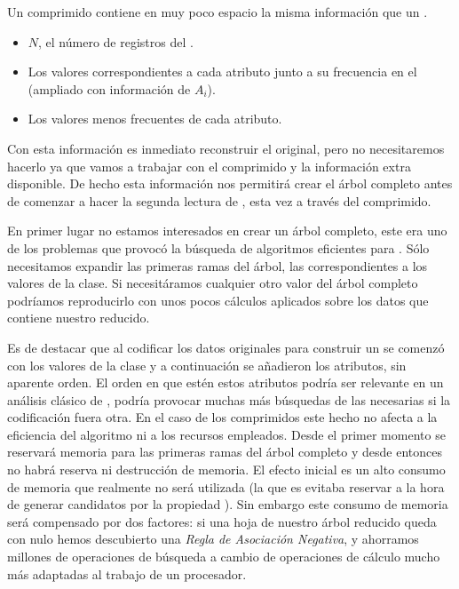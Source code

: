\ABIERTO

Un \catalogo comprimido contiene en muy poco espacio la misma información que un \catalogo.
\begin{itemize}
   \item $N$, el número de registros del \catalogo.
   \item Los valores correspondientes a cada atributo junto a su frecuencia en el \catalogo (\aprioriC[1] ampliado con información de $A_i$).
   \item Los valores menos frecuentes de cada atributo.
\end{itemize}

Con esta información es inmediato reconstruir el \catalogo original, pero no necesitaremos hacerlo ya que vamos a trabajar con el \catalogo comprimido y la información extra disponible. De hecho esta información nos permitirá crear el árbol \aprioriL completo antes de comenzar a hacer la segunda lectura de \D, esta vez a través del \catalogo comprimido.

En primer lugar no estamos interesados en crear un árbol \aprioriL completo, este era uno de los problemas que provocó la búsqueda de algoritmos eficientes para \ARM. Sólo necesitamos expandir las primeras ramas del árbol, las correspondientes a los valores de la clase. Si necesitáramos cualquier otro valor del árbol completo podríamos reproducirlo con unos pocos cálculos aplicados sobre los datos que contiene nuestro \aprioriL reducido.

Es de destacar que al codificar los datos originales para construir un \catalogo se comenzó con los valores de la clase y a continuación se añadieron los atributos, sin aparente orden. El orden en que estén estos atributos podría ser relevante en un análisis clásico de \arm, podría provocar muchas más búsquedas de las necesarias si la codificación fuera otra. En el caso de los \catalogos comprimidos este hecho no afecta a la eficiencia del algoritmo ni a los recursos empleados. Desde el primer momento se reservará memoria para las primeras ramas del árbol \aprioriL completo y desde entonces no habrá reserva ni destrucción de memoria. El efecto inicial es un alto consumo de memoria que realmente no será utilizada (la que es evitaba reservar a la hora de generar candidatos por la propiedad \apriori). Sin embargo este consumo de memoria será compensado por dos factores: si una hoja de nuestro árbol \aprioriL reducido queda con \soporte nulo hemos descubierto una \emph{Regla de Asociación Negativa}, y ahorramos millones de operaciones de búsqueda a cambio de operaciones de cálculo mucho más adaptadas al trabajo de un procesador.








